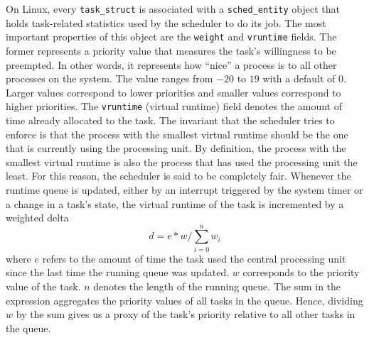 On Linux, every \verb|task_struct| is associated with a \verb|sched_entity| object that holds task-related 
statistics used by the scheduler to do its job. The most important properties of this object 
are the \verb|weight| and \verb|vruntime| fields. The former represents 
a priority value that measures the task's willingness to be preempted. In other words, it represents 
how \enquote{nice} a process is to all other processes on the system. The value ranges from $-20$
to $19$ with a default of $0$. Larger values correspond to lower priorities and smaller values correspond 
to higher priorities. The \verb|vruntime| (virtual runtime) field denotes the amount of time already 
allocated to the task. The invariant that the scheduler tries to enforce is that the process with the 
smallest virtual runtime should be the one that is currently using the processing unit. By definition,
the process with the smallest virtual runtime is also the process that has used the processing unit
the least. For this reason, the scheduler is said to be completely fair. 
Whenever the runtime queue is updated, either by an interrupt triggered by the system timer or a 
change in a task's state, the virtual runtime of the task is incremented by a weighted delta
\begin{equation}
    d = e * w / \sum_{i = 0}^{n} w_{i}
\end{equation}
where $e$ refers to the amount of time the task used the central processing unit 
since the last time the running queue was updated. 
$w$ corresponds to the priority value of the task. $n$ denotes the length of the running queue. 
The sum in the expression aggregates the priority values of all tasks in the queue. 
Hence, dividing $w$ by the sum gives us a proxy of the task's priority relative to all 
other tasks in the queue. 


